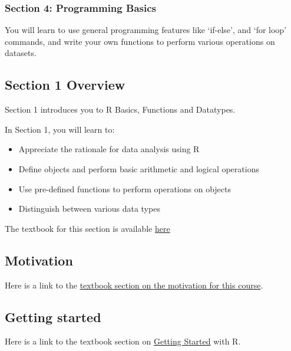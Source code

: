 \documentclass[
]{article}
\providecommand{\tightlist}{%
  \setlength{\itemsep}{0pt}\setlength{\parskip}{0pt}}
\begin{document}
\hypertarget{section-4-programming-basics}{%
\subsubsection{Section 4: Programming
Basics}\label{section-4-programming-basics}}

You will learn to use general programming features like `if-else', and
`for loop' commands, and write your own functions to perform various
operations on datasets.

\hypertarget{section-1-overview}{%
\subsection{Section 1 Overview}\label{section-1-overview}}

Section 1 introduces you to R Basics, Functions and Datatypes.

In Section 1, you will learn to:

\begin{itemize}
\tightlist
\item
  Appreciate the rationale for data analysis using R
\item
  Define objects and perform basic arithmetic and logical operations
\item
  Use pre-defined functions to perform operations on objects
\item
  Distinguish between various data types
\end{itemize}

The textbook for this section is available
\href{https://rafalab.github.io/dsbook/r-basics.html}{here}

\hypertarget{motivation}{%
\subsection{Motivation}\label{motivation}}

Here is a link to the
\href{https://rafalab.github.io/dsbook/r-basics.html\#case-study-us-gun-murders}{textbook
section on the motivation for this course}.

\hypertarget{getting-started}{%
\subsection{Getting started}\label{getting-started}}

Here is a link to the textbook section on
\href{https://rafalab.github.io/dsbook/getting-started.html}{Getting
Started} with R.
\end{document}
